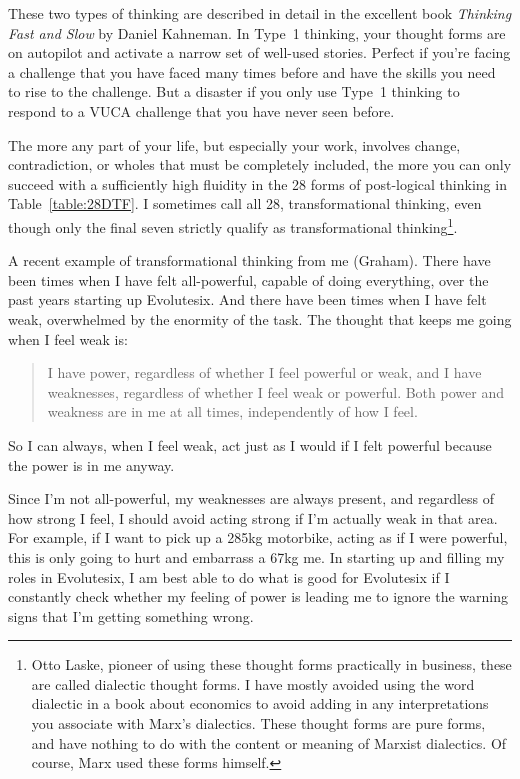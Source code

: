 These two types of thinking are described in detail in the excellent book \emph{Thinking Fast and Slow} by Daniel Kahneman\cite{kahneman-thinking}. In Type~1 thinking, your thought forms are on autopilot and activate a narrow set of well-used stories. Perfect if you're facing a challenge that you have faced many times before and have the skills you need to rise to the challenge. But a disaster if you only use Type~1 thinking to respond to a VUCA challenge that you have never seen before.


The more any part of your life, but especially your work, involves change, contradiction, or wholes that must be completely included, the more you can only succeed with a sufficiently high fluidity in the 28 forms of post-logical thinking in Table~\ref{table:28DTF}. I sometimes call all 28, transformational thinking, even though only the final seven strictly qualify as transformational thinking\footnote{Otto Laske, pioneer of using these thought forms practically in business, these are called dialectic thought forms. I have mostly avoided using the word dialectic in a book about economics to avoid adding in any interpretations you associate with Marx's dialectics.  These thought forms are pure forms, and have nothing to do with the content or meaning of Marxist dialectics. Of course, Marx used these forms himself.}.


A recent example of transformational thinking from me (Graham). There have been times when I have felt all-powerful, capable of doing everything, over the past years starting up Evolutesix. And there have been times when I have felt weak, overwhelmed by the enormity of the task. The thought that keeps me going when I feel weak is: 
\begin{quote}
I have power, regardless of whether I feel powerful or weak, and I have weaknesses, regardless of whether I feel weak or powerful. Both power and weakness are in me at all times, independently of how I feel.
\end{quote}
So I can always, when I feel weak, act just as I would if I felt powerful because the power is in me anyway.


Since I'm not all-powerful, my weaknesses are always present, and regardless of how strong I feel, I should avoid acting strong if I'm actually weak in that area. For example, if I want to pick up a 285kg motorbike, acting as if I were powerful, this is only going to hurt and embarrass a 67kg me. In starting up and filling my roles in Evolutesix, I am best able to do what is good for Evolutesix if I constantly check whether my feeling of power is leading me to ignore the warning signs that I'm getting something wrong. 


